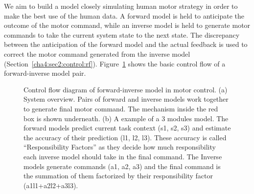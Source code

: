 We aim to build a model closely simulating human motor strategy in order to make the best use of the human data. A forward model is held to anticipate the outcome of the motor command, while an inverse model is held to generate motor commands to take the current system state to the next state. The discrepancy between the anticipation of the forward model and the actual feedback is used to correct the motor command generated from the inverse model (Section~\ref{cha4:sec2:control:rf}). Figure~\ref{fig:control} shows the basic control flow of a forward-inverse model pair.

\begin{figure}
  \centering
      \vspace{0.5cm}
  \caption{ \scriptsize{Control flow diagram of forward-inverse model in motor control. (a) System overview. Pairs of forward and inverse models work together to generate final motor command. The mechanism inside the red box is shown underneath. (b) A example of a 3 modules model. The forward models predict current task context (s1, s2, s3) and estimate the accuracy of their prediction (l1, l2, l3). These accuracy is called ``Responsibility Factors'' as they decide how much responsibility each inverse model should take in the final command. The Inverse models generate commands (a1, a2, a3) and the final command is the summation of them factorized by their responsibility factor (a1l1+a2l2+a3l3).  }
}
\label{fig:control}
\end{figure}

